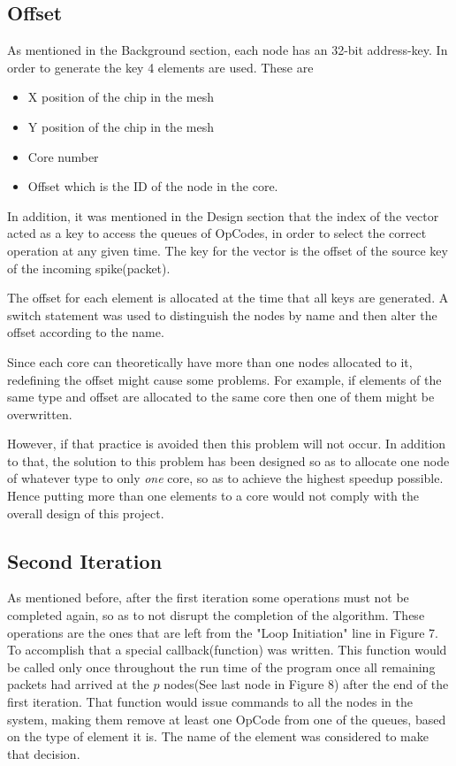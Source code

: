 \documentclass[12pt,twosided]{article}
\begin{document}
\subsection{Offset}
As mentioned in the Background section, each node has an 32-bit address-key. In order to generate the key 4 elements are used. These are
\begin{itemize}
\item X position of the chip in the mesh
\item Y position of the chip in the mesh
\item Core number
\item Offset which is the ID of the node in the core.
\end{itemize}
In addition, it was mentioned in the Design section that the index of the vector acted as a key to access the queues of OpCodes, in order to select the correct operation at any given time. The key for the vector is the offset of the source key of the incoming spike(packet).

The offset for each element is allocated at the time that all keys are generated. A switch statement was used to distinguish the nodes by name and then alter the offset according to the name. 

Since each core can theoretically have more than one nodes allocated to it, redefining the offset might cause some problems. For example, if elements of the same type and offset are allocated to the same core then one of them might be overwritten. 

However, if that practice is avoided then this problem will not occur. In addition to that, the solution to this problem has been designed so as to allocate one node of whatever type to only \emph{one} core, so as to achieve the highest speedup possible. Hence putting more than one elements to a core would not comply with the overall design of this project.
\subsection{Second Iteration}
As mentioned before, after the first iteration some operations must not be completed again, so as to not disrupt the completion of the algorithm. These operations are the ones that are left from the "Loop Initiation" line in Figure 7. To accomplish that a special callback(function) was written. This function would be called only once throughout the run time of the program once all remaining packets had arrived at the $p$ nodes(See last node in Figure 8) after the end of the first iteration. That function would issue commands to all the nodes in the system, making them remove at least one OpCode from one of the queues, based on the type of element it is. The name of the element was considered to make that decision.
\end{document}
